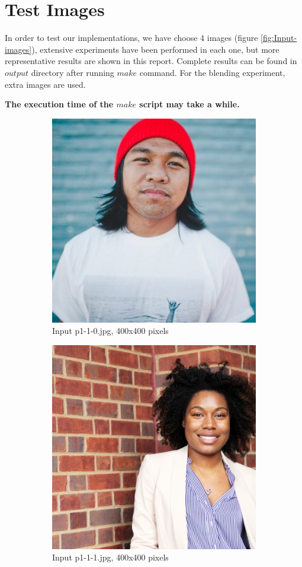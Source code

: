 \section{Test Images}

In order to test our implementations, we have choose 4 images (figure \ref{fig:Input-images}), extensive experiments have been performed in each one, but more representative results are shown in this report. Complete results can be found in $output$ directory after running $make$ command. For the blending experiment, extra images are used. 

\textbf{The execution time of the $make$ script may take a while.}

\begin{figure}[h!]
\centering
\begin{subfigure}{0.5\textwidth}
  \centering
  \includegraphics[width=0.5\linewidth]{input/p1-1-0.jpg}
  \caption{Input p1-1-0.jpg, 400x400 pixels}
\end{subfigure}%
\begin{subfigure}{0.5\textwidth}
  \centering
  \includegraphics[width=0.5\linewidth]{input/p1-1-1.jpg}
  \caption{Input p1-1-1.jpg, 400x400 pixels}
\end{subfigure}
\begin{subfigure}{0.5\textwidth}

\end{subfigure}
\end{figure}
